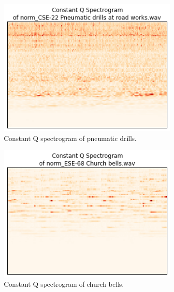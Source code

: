 \documentclass{sig-alternate-05-2015}
\begin{document}
\begin{figure}[hbt]
        \begin{subfigure}[b]{0.45\textwidth}
      \centering
      \includegraphics[width=\textwidth]{figures/cqt_pneumatic_drills.png}
      \caption{Constant Q spectrogram of pneumatic drills.}
      \label{fig:cqt-applause}
    \end{subfigure}
    \hfill 
    \begin{subfigure}[b]{0.45\textwidth}
      \centering
      \includegraphics[width=\textwidth]{figures/cqtChurchBells.png}
      \caption{Constant Q spectrogram of church bells.}
      \label{fig:cqt-applause}
    \end{subfigure}
    \\
    \begin{subfigure}[b]{0.45\textwidth}

\end{subfigure}
\end{figure}
\end{document}
